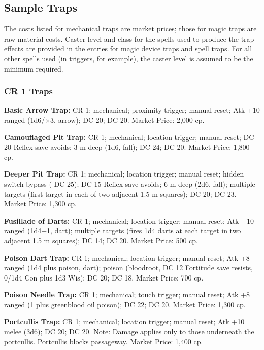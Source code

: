 \subsection{Sample Traps}
The costs listed for mechanical traps are market prices; those for magic traps are raw material costs. Caster level and class for the spells used to produce the trap effects are provided in the entries for magic device traps and spell traps. For all other spells used (in triggers, for example), the caster level is assumed to be the minimum required.

\subsubsection{CR 1 Traps}
\textbf{Basic Arrow Trap:} CR 1; mechanical; proximity trigger; manual reset; Atk +10 ranged (1d6/$\times$3, arrow);  DC 20;  DC 20. Market Price: 2,000 cp.

\textbf{Camouflaged Pit Trap:} CR 1; mechanical; location trigger; manual reset; DC 20 Reflex save avoids; 3 m deep (1d6, fall);  DC 24;  DC 20. Market Price: 1,800 cp.

\textbf{Deeper Pit Trap:} CR 1; mechanical; location trigger; manual reset; hidden switch bypass ( DC 25); DC 15 Reflex save avoids; 6 m deep (2d6, fall); multiple targets (first target in each of two adjacent 1.5 m squares);  DC 20;  DC 23. Market Price: 1,300 cp.

\textbf{Fusillade of Darts:} CR 1; mechanical; location trigger; manual reset; Atk +10 ranged (1d4+1, dart); multiple targets (fires 1d4 darts at each target in two adjacent 1.5 m squares);  DC 14;  DC 20. Market Price: 500 cp.

\textbf{Poison Dart Trap:} CR 1; mechanical; location trigger; manual reset; Atk +8 ranged (1d4 plus poison, dart); poison (bloodroot, DC 12 Fortitude save resists, 0/1d4 Con plus 1d3 Wis);  DC 20;  DC 18. Market Price: 700 cp.

\textbf{Poison Needle Trap:} CR 1; mechanical; touch trigger; manual reset; Atk +8 ranged (1 plus greenblood oil poison);  DC 22;  DC 20. Market Price: 1,300 cp.

\textbf{Portcullis Trap:} CR 1; mechanical; location trigger; manual reset; Atk +10 melee (3d6);  DC 20;  DC 20. Note: Damage applies only to those underneath the portcullis. Portcullis blocks passageway. Market Price: 1,400 cp.


